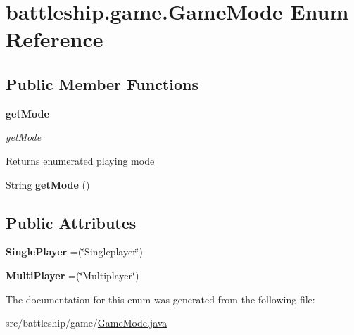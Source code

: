 \hypertarget{enumbattleship_1_1game_1_1GameMode}{}\section{battleship.\+game.\+Game\+Mode Enum Reference}
\label{enumbattleship_1_1game_1_1GameMode}
\subsection*{Public Member Functions}
\begin{Indent}{\bf get\+Mode}\par
{\em get\+Mode

\begin{DoxyReturn}{Returns}
enumerated playing mode 
\end{DoxyReturn}
}\begin{DoxyCompactItemize}
\item 
\hypertarget{enumbattleship_1_1game_1_1GameMode_a8b400a2395a61cc258933241fab7c0bd}{}String {\bfseries get\+Mode} ()\label{enumbattleship_1_1game_1_1GameMode_a8b400a2395a61cc258933241fab7c0bd}

\end{DoxyCompactItemize}
\end{Indent}
\subsection*{Public Attributes}
\begin{DoxyCompactItemize}
\item 
\hypertarget{enumbattleship_1_1game_1_1GameMode_ace408bcb44c6aa331c9950621f1f5c06}{}{\bfseries Single\+Player} =(\char`\"{}Singleplayer\char`\"{})\label{enumbattleship_1_1game_1_1GameMode_ace408bcb44c6aa331c9950621f1f5c06}

\item 
\hypertarget{enumbattleship_1_1game_1_1GameMode_a52216e42b3e4afe2ae0c48ccb833fe6e}{}{\bfseries Multi\+Player} =(\char`\"{}Multiplayer\char`\"{})\label{enumbattleship_1_1game_1_1GameMode_a52216e42b3e4afe2ae0c48ccb833fe6e}

\end{DoxyCompactItemize}


The documentation for this enum was generated from the following file\+:\begin{DoxyCompactItemize}
\item 
src/battleship/game/\hyperlink{GameMode_8java}{Game\+Mode.\+java}\end{DoxyCompactItemize}
